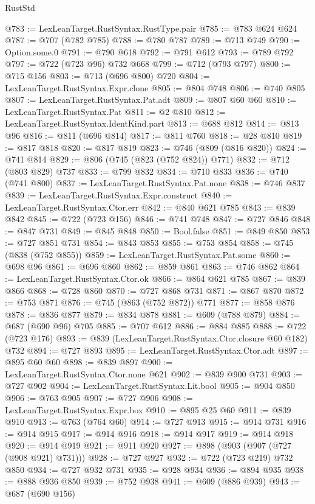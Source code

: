 \begin{lexlean}{RustStd}
\begin{coremodule}
@783 := LexLeanTarget.RustSyntax.RustType.pair
@785 := @783 @624 @624
@787 := @707 (@782 @785)
@788 := @780 @787
@789 := @713 @749
@790 := Option.some.{0}
@791 := @790 @618
@792 := @791 @612
@793 := @789 @792
@797 := @722 (@723 @96) @732 @668
@799 := @712 (@793 @797)
@800 := @715 @156
@803 := @713 (@696 @800) @720
@804 := LexLeanTarget.RustSyntax.Expr.clone
@805 := @804 @748
@806 := @740 @805
@807 := LexLeanTarget.RustSyntax.Pat.adt
@809 := @807 @60 @60
@810 := LexLeanTarget.RustSyntax.Pat
@811 := @2 @810
@812 := LexLeanTarget.RustSyntax.IdentKind.part
@813 := @688 @812
@814 := @813 @96
@816 := @811 (@696 @814)
@817 := @811 @760
@818 := @28 @810
@819 := @817 @818
@820 := @817 @819
@823 := @746 (@809 (@816 @820))
@824 := @741 @814
@829 := @806 (@745 (@823 (@752 @824)) @771)
@832 := @712 (@803 @829) @737
@833 := @799 @832
@834 := @710 @833
@836 := @740 (@741 @800)
@837 := LexLeanTarget.RustSyntax.Pat.none
@838 := @746 @837
@839 := LexLeanTarget.RustSyntax.Expr.construct
@840 := LexLeanTarget.RustSyntax.Ctor.err
@842 := @840 @621 @785
@843 := @839 @842
@845 := @722 (@723 @156)
@846 := @741 @748
@847 := @727 @846
@848 := @847 @731
@849 := @845 @848
@850 := Bool.false
@851 := @849 @850
@853 := @727 @851 @731
@854 := @843 @853
@855 := @753 @854
@858 := @745 (@838 (@752 @855))
@859 := LexLeanTarget.RustSyntax.Pat.some
@860 := @698 @96
@861 := @696 @860
@862 := @859 @861
@863 := @746 @862
@864 := LexLeanTarget.RustSyntax.Ctor.ok
@866 := @864 @621 @785
@867 := @839 @866
@868 := @728 @860
@870 := @727 @868 @731
@871 := @867 @870
@872 := @753 @871
@876 := @745 (@863 (@752 @872)) @771
@877 := @858 @876
@878 := @836 @877
@879 := @834 @878
@881 := @609 (@788 @879)
@884 := @687 (@690 @96) @705
@885 := @707 @612
@886 := @884 @885
@888 := @722 (@723 @176)
@893 := @839 (LexLeanTarget.RustSyntax.Ctor.closure @60 @182) @732
@894 := @727 @893
@895 := LexLeanTarget.RustSyntax.Ctor.adt
@897 := @895 @60 @60
@898 := @839 @897
@900 := LexLeanTarget.RustSyntax.Ctor.none @621
@902 := @839 @900 @731
@903 := @727 @902
@904 := LexLeanTarget.RustSyntax.Lit.bool
@905 := @904 @850
@906 := @763 @905
@907 := @727 @906
@908 := LexLeanTarget.RustSyntax.Expr.box
@910 := @895 @25 @60
@911 := @839 @910
@913 := @763 (@764 @60)
@914 := @727 @913
@915 := @914 @731
@916 := @914 @915
@917 := @914 @916
@918 := @914 @917
@919 := @914 @918
@920 := @914 @919
@921 := @911 @920
@927 := @898 (@903 (@907 (@727 (@908 @921) @731)))
@928 := @727 @927
@932 := @722 (@723 @219) @732 @850
@934 := @727 @932 @731
@935 := @928 @934
@936 := @894 @935
@938 := @888 @936 @850
@939 := @752 @938
@941 := @609 (@886 @939)
@943 := @687 (@690 @156)

\end{coremodule}
\end{lexlean}
